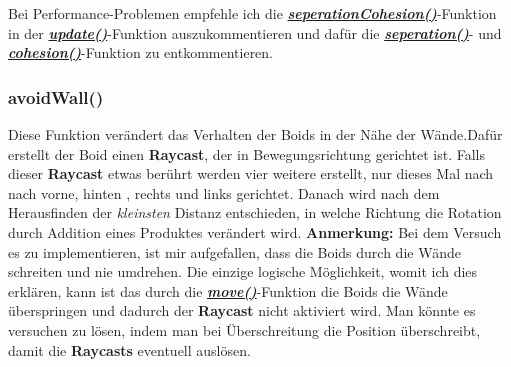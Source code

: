 \documentclass[a4paper, hidelinks, 12pt]{article}
\begin{document}
Bei Performance-Problemen empfehle ich die \hyperref[UmsetzungseperationCohesion]{\textbf{\emph{seperationCohesion()}}}-Funktion in der \hyperref[Umsetzungupdate]{\textbf{\emph{update()}}}-Funktion auszukommentieren und dafür die \hyperref[Umsetzungseperation]{\textbf{\emph{seperation()}}}- und \hyperref[Umsetzungcohesion]{\textbf{\emph{cohesion()}}}-Funktion zu entkommentieren.
\newline

		
\normalsize\subsubsection{avoidWall()}\label{UmsetzungavoidWall}
Diese Funktion verändert das Verhalten der Boids in der Nähe der Wände.\newline Dafür erstellt der Boid einen \textbf{Raycast}\cite{raycast}, der in Bewegungsrichtung gerichtet ist. Falls dieser \textbf{Raycast} etwas berührt werden vier weitere erstellt, nur dieses Mal nach nach vorne, hinten , rechts und links gerichtet. Danach wird nach dem Herausfinden der \emph{kleinsten} Distanz\cite{HitInfo} entschieden, in welche Richtung die Rotation durch Addition eines Produktes verändert wird.\newline\newline
\scriptsize\textbf{Anmerkung:} Bei dem Versuch es zu implementieren, ist mir aufgefallen, dass die Boids durch die Wände schreiten und nie umdrehen. Die einzige logische Möglichkeit, womit ich dies erklären, kann ist das durch die \hyperref[Umsetzungmove]{\textbf{\emph{move()}}}-Funktion die Boids die Wände überspringen und dadurch der \textbf{Raycast} nicht aktiviert wird. Man könnte es versuchen zu lösen, indem man bei Überschreitung die Position überschreibt, damit die \textbf{Raycasts} eventuell auslösen.
\newline\newline
	
\end{document}
